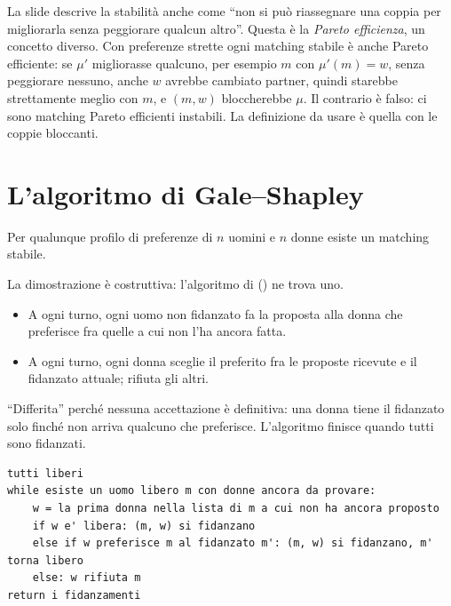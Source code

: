 \begin{attenzione}
La slide descrive la stabilità anche come ``non si può riassegnare una coppia per
migliorarla senza peggiorare qualcun altro''. Questa è la \emph{Pareto efficienza}, un
concetto diverso. Con preferenze strette ogni matching stabile è anche Pareto efficiente:
se $\mu'$ migliorasse qualcuno, per esempio $m$ con $\mu'(m) = w$, senza peggiorare nessuno,
anche $w$ avrebbe cambiato partner, quindi starebbe strettamente meglio con $m$, e $(m, w)$
bloccherebbe $\mu$. Il contrario è falso: ci sono matching Pareto efficienti instabili. La
definizione da usare è quella con le coppie bloccanti.
\end{attenzione}

\section{L'algoritmo di Gale--Shapley}

\begin{teorema}
Per qualunque profilo di preferenze di $n$ uomini e $n$ donne esiste un matching stabile.
\end{teorema}

La dimostrazione è costruttiva: l'algoritmo di 
() ne trova uno.
\begin{itemize}
  \item A ogni turno, ogni uomo non fidanzato fa la proposta alla donna che preferisce fra
        quelle a cui non l'ha ancora fatta.
  \item A ogni turno, ogni donna sceglie il preferito fra le proposte ricevute e il
        fidanzato attuale; rifiuta gli altri.
\end{itemize}
``Differita'' perché nessuna accettazione è definitiva: una donna tiene il fidanzato solo
finché non arriva qualcuno che preferisce. L'algoritmo finisce quando tutti sono fidanzati.

\begin{lstlisting}[style=pseudo]
tutti liberi
while esiste un uomo libero m con donne ancora da provare:
    w = la prima donna nella lista di m a cui non ha ancora proposto
    if w e' libera: (m, w) si fidanzano
    else if w preferisce m al fidanzato m': (m, w) si fidanzano, m' torna libero
    else: w rifiuta m
return i fidanzamenti
\end{lstlisting}

